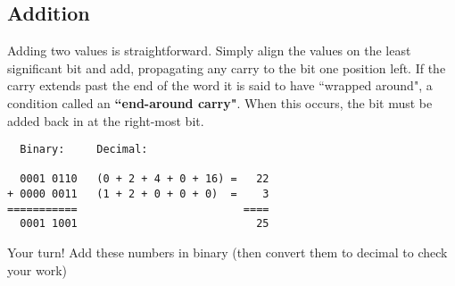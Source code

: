 
\bigskip

\subsection*{Addition}

Adding two values is straightforward. Simply align the values on the least significant bit and add, propagating any carry to the bit one position left. If the carry extends past the end of the word it is said to have ``wrapped around", a condition called an \textbf{``end-around carry"}. When this occurs, the bit must be added back in at the right-most bit. %

\begin{verbatim}
  Binary:     Decimal:
   
  0001 0110   (0 + 2 + 4 + 0 + 16) =   22
+ 0000 0011   (1 + 2 + 0 + 0 + 0)  =    3
===========                          ====
  0001 1001                            25
\end{verbatim}


\bigskip

\noindent Your turn! Add these numbers in binary (then convert them to decimal to check your work)

\bigskip

